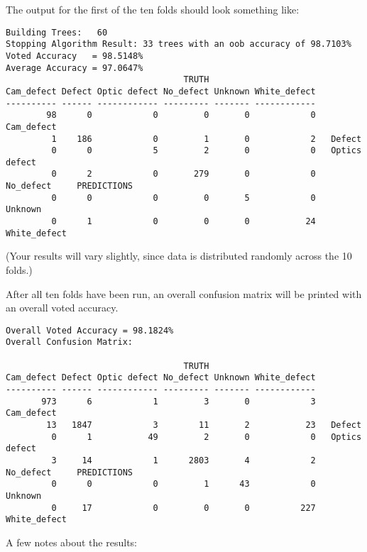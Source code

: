 \documentclass{article}
\begin{document}
The output for the first of the ten folds should look something like:
\begin{verbatim}
Building Trees:   60
Stopping Algorithm Result: 33 trees with an oob accuracy of 98.7103%
Voted Accuracy   = 98.5148%
Average Accuracy = 97.0647%
                                   TRUTH
Cam_defect Defect Optic defect No_defect Unknown White_defect 
---------- ------ ------------ --------- ------- ------------ 
        98      0            0         0       0            0   Cam_defect
         1    186            0         1       0            2   Defect
         0      0            5         2       0            0   Optics defect
         0      2            0       279       0            0   No_defect     PREDICTIONS
         0      0            0         0       5            0   Unknown
         0      1            0         0       0           24   White_defect
\end{verbatim}
(Your results will vary slightly, since data is distributed randomly across the 10 folds.)

After all ten folds have been run, an overall confusion matrix will be printed
with an overall voted accuracy.
\begin{verbatim}
Overall Voted Accuracy = 98.1824%
Overall Confusion Matrix:

                                   TRUTH
Cam_defect Defect Optic defect No_defect Unknown White_defect 
---------- ------ ------------ --------- ------- ------------ 
       973      6            1         3       0            3   Cam_defect
        13   1847            3        11       2           23   Defect
         0      1           49         2       0            0   Optics defect
         3     14            1      2803       4            2   No_defect     PREDICTIONS
         0      0            0         1      43            0   Unknown
         0     17            0         0       0          227   White_defect
\end{verbatim}

A few notes about the results:
\end{document}
